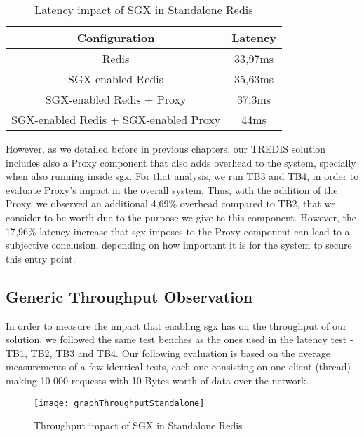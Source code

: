 \begin{table}[ht]
	\caption{Latency impact of SGX in Standalone Redis} %
	\centering %
	\begin{tabular}{c c} %
		\hline\hline %
		\textbf{Configuration} & \textbf{Latency} \\ [0.5ex] %
		\hline
		Redis & 33,97ms\\
		\hline
		SGX-enabled Redis & 35,63ms \\
		\hline
	    SGX-enabled Redis + Proxy & 37,3ms \\
		\hline %
	    SGX-enabled Redis + SGX-enabled Proxy & 44ms\\ [1ex] %
		\hline %
	\end{tabular}
	\label{table:latencySingleRedis} %
\end{table}

However, as we detailed before in previous chapters, our TREDIS solution includes also a Proxy component that also adds overhead to the system, specially when also running inside \gls{sgx}. For that analysis, we run TB3 and TB4, in order to evaluate Proxy's impact in the overall system. Thus, with the addition of the Proxy, we observed an additional 4,69\% overhead compared to TB2, that we consider to be worth due to the purpose we give to this component. However, the 17,96\% latency increase that \gls{sgx} imposes to the Proxy component can lead to a subjective conclusion, depending on how important it is for the system to secure this entry point.

\subsection{Generic Throughput Observation}

In order to measure the impact that enabling \gls{sgx} has on the throughput of our solution, we followed the same test benches as the ones used in the latency test - TB1, TB2, TB3 and TB4. Our following evaluation is based on the average measurements of a few identical tests, each one consisting on one client (thread) making 10 000 requests with 10 Bytes worth of data over the network.

\begin{figure}[htbp]
	\centering
	{\texttt{[image: graphThroughputStandalone]}}
	\caption{Throughput impact of SGX in Standalone Redis}
	\label{fig:graphThroughputStandalone}
\end{figure}

